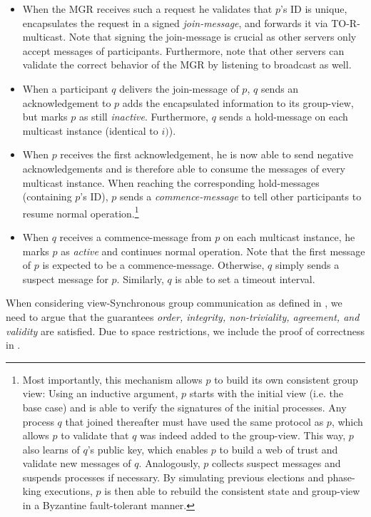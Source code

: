 \documentclass[runningheads]{llncs}
\begin{document}
\begin{enumerate}
\begin{itemize}
        \item When the MGR receives such a request he validates that $p$'s ID is unique, encapsulates the request in a signed \textit{join-message}, and forwards it via TO-R-multicast. Note that signing the join-message is crucial as other servers only accept messages of participants. Furthermore, note that other servers can validate the correct behavior of the MGR by listening to broadcast as well. 
        \item When a participant $q$ delivers the join-message of $p$, $q$ sends an acknowledgement to $p$ adds the encapsulated information to its group-view, but marks $p$ as still \textit{inactive}. Furthermore, $q$ sends a hold-message on each multicast instance (identical to $i)$). 
        \item When $p$ receives the first acknowledgement, he is now able to send negative acknowledgements and is therefore able to consume the messages of every multicast instance. When reaching the corresponding hold-messages (containing $p$'s ID), $p$ sends a \textit{commence-message} to tell other participants to resume normal operation.\footnote{Most importantly, this mechanism allows $p$ to build its own consistent group view: Using an inductive argument, $p$ starts with the initial view (i.e. the base case) and is able to verify the signatures of the initial processes. Any process $q$ that joined thereafter must have used the same protocol as $p$, which allows $p$ to validate that $q$ was indeed added to the group-view. This way, $p$ also learns of $q$'s public key, which enables $p$ to build a web of trust and validate new messages of $q$. Analogously, $p$ collects suspect messages and suspends processes if necessary. By simulating previous elections and phase-king executions, $p$ is then able to rebuild the consistent state and group-view in a Byzantine fault-tolerant manner. }
        \item When $q$ receives a commence-message from $p$ on each multicast instance, he marks $p$ as \textit{active} and continues normal operation. Note that the first message of $p$ is expected to be a commence-message. Otherwise, $q$ simply sends a suspect message for $p$. Similarly, $q$ is able to set a timeout interval.
    \end{itemize} 
\end{enumerate}
When considering view-Synchronous group communication as defined in \cite[p. ~772-773]{ds_book}, we need to argue that the guarantees \textit{order, integrity, non-triviality, agreement, and validity} are satisfied. Due to space restrictions, we include the proof of correctness in .
\end{document}
